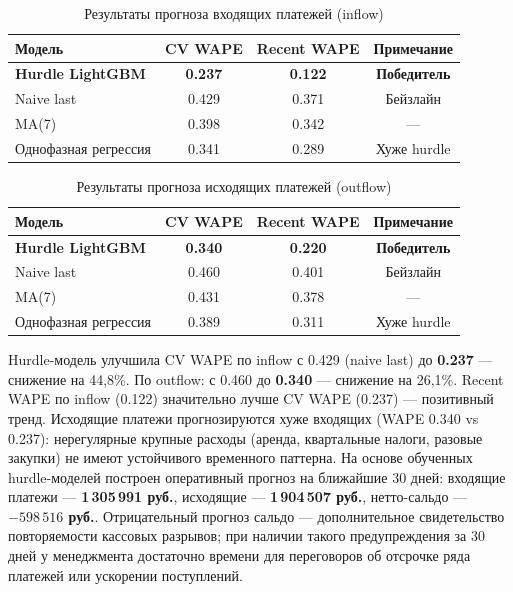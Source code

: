 \begin{table}[H]
\centering
\caption{Результаты прогноза входящих платежей (inflow)}
\label{tab:inflow_model}
\begin{tabular}{lccc}
\toprule
\textbf{Модель} & \textbf{CV WAPE} & \textbf{Recent WAPE} & \textbf{Примечание} \\
\midrule
\textbf{Hurdle LightGBM} & \textbf{0.237} & \textbf{0.122} & \textbf{Победитель} \\
Naive last & 0.429 & 0.371 & Бейзлайн \\
MA(7) & 0.398 & 0.342 & --- \\
Однофазная регрессия & 0.341 & 0.289 & Хуже hurdle \\
\bottomrule
\end{tabular}
\end{table}

\begin{table}[H]
\centering
\caption{Результаты прогноза исходящих платежей (outflow)}
\label{tab:outflow_model}
\begin{tabular}{lccc}
\toprule
\textbf{Модель} & \textbf{CV WAPE} & \textbf{Recent WAPE} & \textbf{Примечание} \\
\midrule
\textbf{Hurdle LightGBM} & \textbf{0.340} & \textbf{0.220} & \textbf{Победитель} \\
Naive last & 0.460 & 0.401 & Бейзлайн \\
MA(7) & 0.431 & 0.378 & --- \\
Однофазная регрессия & 0.389 & 0.311 & Хуже hurdle \\
\bottomrule
\end{tabular}
\end{table}

Hurdle-модель улучшила CV WAPE по inflow с 0.429 (naive last) до \textbf{0.237} --- снижение на 44,8\%. По outflow: с 0.460 до \textbf{0.340} --- снижение на 26,1\%. Recent WAPE по inflow (0.122) значительно лучше CV WAPE (0.237) --- позитивный тренд. Исходящие платежи прогнозируются хуже входящих (WAPE 0.340 vs 0.237): нерегулярные крупные расходы (аренда, квартальные налоги, разовые закупки) не имеют устойчивого временного паттерна. На основе обученных hurdle-моделей построен оперативный прогноз на ближайшие 30 дней: входящие платежи --- \textbf{1\,305\,991 руб.}, исходящие --- \textbf{1\,904\,507 руб.}, нетто-сальдо --- \textbf{$-598\,516$ руб.}. Отрицательный прогноз сальдо --- дополнительное свидетельство повторяемости кассовых разрывов; при наличии такого предупреждения за 30 дней у менеджмента достаточно времени для переговоров об отсрочке ряда платежей или ускорении поступлений.

